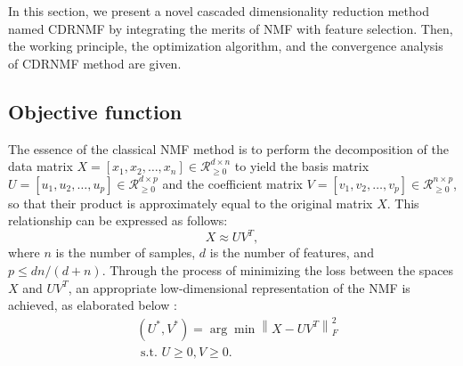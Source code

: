 \documentclass[a4paper,fleqn]{cas-sc}
\begin{document}
In this section, we present a novel cascaded dimensionality reduction method named CDRNMF by integrating the merits of NMF with feature selection. Then, the working principle, the optimization algorithm, and the convergence analysis of CDRNMF method are given.

\subsection{Objective function}

The essence of the classical NMF method is to perform the decomposition of the data matrix $X=\left[x_1, x_2, \ldots, x_n\right] \in \mathcal{R}_{\geq 0}^{d \times n}$ to yield the basis matrix $U=\left[u_1, u_2, \ldots, u_p\right] \in \mathcal{R}_{\geq 0}^{d \times p}$ and the coefficient matrix $V=\left[v_1, v_2, \ldots, v_p\right] \in \mathcal{R}_{\geq 0}^{n \times p}$, so that their product is approximately equal to the original matrix $X$. This relationship can be expressed as follows:
\begin{equation}
	X \approx U V^T,
\end{equation}
where $n$ is the number of samples, $d$ is the number of features, and $p \leq d n /(d+n)$. Through the process of minimizing the loss between the spaces $X$ and $U V^T$, an appropriate low-dimensional representation of the NMF is achieved, as elaborated below \cite{8}:
\begin{equation}
	\begin{aligned}
		& \left(U^*, V^*\right)=\arg \min \left\|X-U V^T\right\|_F^2 \\
		& \text { s.t. } U \geq 0, V \geq 0.
	\end{aligned}
\end{equation}
\end{document}
